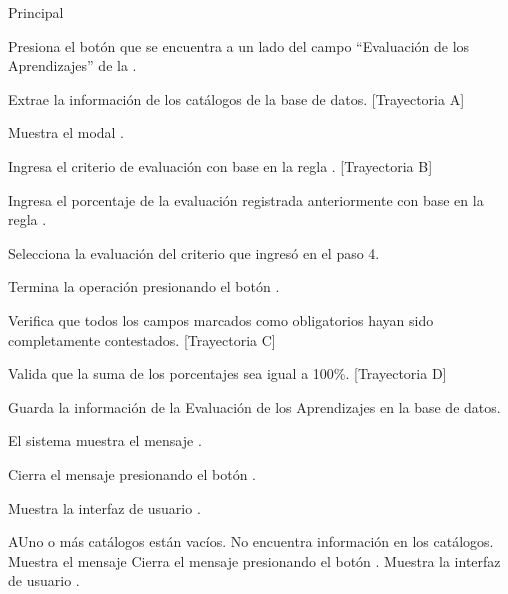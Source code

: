 \begin{UCtrayectoria}{Principal}

	\UCpaso[\UCactor] Presiona el botón \BtnModal que se encuentra a un lado del campo ``Evaluación de los Aprendizajes'' de la .
	
	\UCpaso Extrae la información de los catálogos de la base de datos. [Trayectoria A]

    \UCpaso Muestra el modal .
    
    \UCpaso[\UCactor] Ingresa el criterio de evaluación con base en la regla . [Trayectoria B]

    \UCpaso[\UCactor] Ingresa el porcentaje de la evaluación registrada anteriormente con base en la regla .
    
    \UCpaso[\UCactor] Selecciona la evaluación del criterio que ingresó en el paso 4.
    
    \UCpaso[\UCactor] Termina la operación presionando el botón .

    \UCpaso Verifica que todos los campos marcados como obligatorios hayan sido completamente contestados. [Trayectoria C]

    \UCpaso Valida que la suma de los porcentajes sea igual a 100\%. [Trayectoria D]

    \UCpaso Guarda la información de la Evaluación de los Aprendizajes en la base de datos.

    \UCpaso El sistema muestra el mensaje .

    \UCpaso[\UCactor] Cierra el mensaje presionando el botón .

    \UCpaso Muestra la interfaz de usuario .
    
\end{UCtrayectoria}


\begin{UCtrayectoriaA}{A}{Uno o más catálogos están vacíos.}
	\UCpaso No encuentra información en los catálogos.
    \UCpaso Muestra el mensaje 
    \UCpaso[\UCactor] Cierra el mensaje presionando el botón .
	\UCpaso Muestra la interfaz de usuario .
\end{UCtrayectoriaA}

